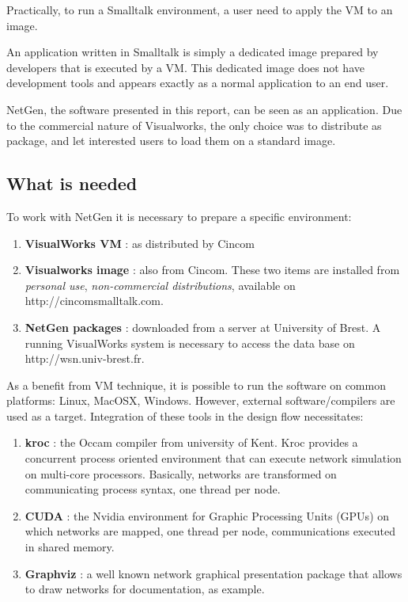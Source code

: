 \documentclass[times]{book}
\begin{document}
Practically, to run a Smalltalk environment, a user need to apply the VM to an image.

An application written in Smalltalk is simply a dedicated image prepared by developers
that is executed by a VM. This dedicated image does not have development tools and
appears exactly as a normal application to an end user.

NetGen, the software presented in this report, can be seen as an application. Due to the
commercial nature of Visualworks, the only choice was to distribute as package, and let
interested users to load them on a standard image.

\subsection{What is needed}

To work with NetGen it is necessary to prepare a specific environment:

\begin{enumerate}
\item  {\bf VisualWorks VM} : as distributed by Cincom
\item  {\bf Visualworks image} : also from Cincom. These two items are installed 
from {\sl personal use}, {\sl non-commercial distributions},  available  on 
http://cincomsmalltalk.com.

\item  {\bf NetGen packages} : downloaded from a server at University of Brest.
A running VisualWorks system is necessary to access the data base
on http://wsn.univ-brest.fr.
\end{enumerate}

As a benefit from VM technique, it is possible to run the software on common 
platforms: Linux, MacOSX, Windows. However, external software/compilers  are used 
as a target. Integration of these tools in the design flow necessitates:

\begin{enumerate}
\item {\bf kroc} : the Occam compiler from university of Kent. Kroc provides a concurrent
process oriented environment that can execute network simulation on multi-core processors.
Basically, networks are transformed on communicating process syntax, one thread per node.
\item {\bf CUDA} : the Nvidia environment for Graphic Processing Units (GPUs) on which
networks are mapped, one thread per node, communications executed in shared memory.
\item {\bf Graphviz} : a well known network graphical presentation package that allows to draw
networks for documentation, as example.
\end{enumerate}
\end{document}
